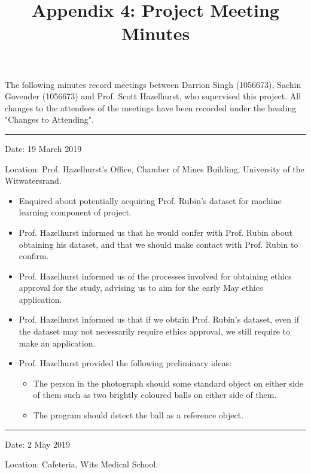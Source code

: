 \documentclass[conference, onecolumn]{IEEEtran}
\title{Appendix 4: Project Meeting Minutes}
\begin{document}
\maketitle
The following minutes record meetings between Darrion Singh (1056673), Sachin Govender (1056673) and Prof. Scott Hazelhurst, who supervised this project.
All changes to the attendees of the meetings have been recorded under the heading "Changes to Attending".

\rule{\linewidth}{2pt}

Date: 19 March 2019

Location: Prof. Hazelhurst's Office, Chamber of Mines Building, University of the Witwatersrand.
\begin{itemize}
	\item Enquired about potentially acquiring Prof. Rubin's dataset for machine learning component of project.
	\item Prof. Hazelhurst informed us that he would confer with Prof. Rubin about obtaining his dataset, and that we should make contact with Prof. Rubin to confirm.
	\item Prof. Hazelhurst informed us of the processes involved for obtaining ethics approval for the study, advising us to aim for the early May ethics application.
	\item Prof. Hazelhurst informed us that if we obtain Prof. Rubin's dataset, even if the dataset may not necessarily require ethics approval, we still require to make an application.
	\item Prof. Hazelhurst provided the following preliminary ideas:
	\begin{itemize}
		\item The person in the photograph should some standard object on either side of them such as two brightly coloured balls on either side of them.
		\item The program should detect the ball as a reference object.
	\end{itemize}
\end{itemize}

\rule{\linewidth}{2pt}

Date: 2 May 2019

Location: Cafeteria, Wits Medical School.
\end{document}
